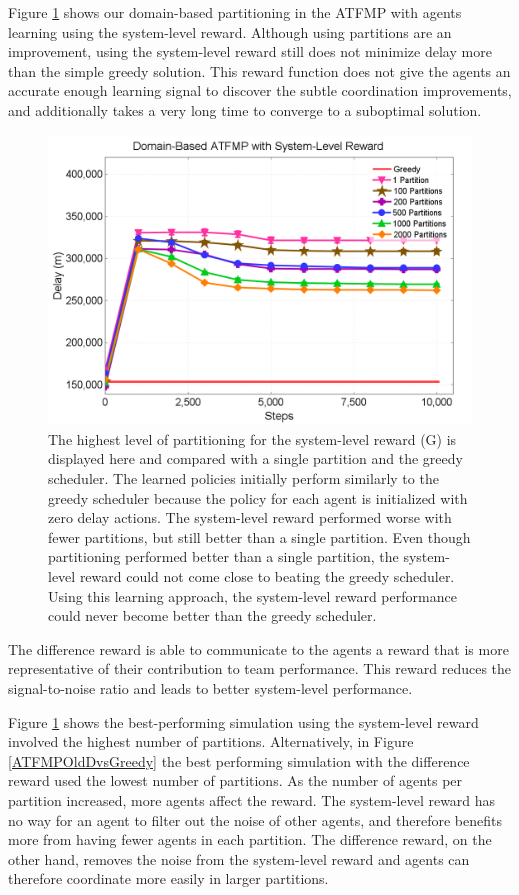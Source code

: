 \documentclass[smallcondensed]{svjour3}
\begin{document}
Figure \ref{ClusterRewardsGreedyG} shows our domain-based partitioning in the ATFMP with agents learning using the system-level reward. Although using partitions are an improvement, using the system-level reward still does not minimize delay more than the simple greedy solution. This reward function does not give the agents an accurate enough learning signal to discover the subtle coordination improvements, and additionally takes a very long time to converge to a suboptimal solution. 

\begin{figure}[]
\centering
\includegraphics[width=.75\columnwidth]{ClusterRewardsGreedyG}
\caption{The highest level of partitioning for the system-level reward (G) is displayed here and compared with a single partition and the greedy scheduler. The learned policies initially perform similarly to the greedy scheduler because the policy for each agent is initialized with zero delay actions. The system-level reward performed worse with fewer partitions, but still better than a single partition. Even though partitioning performed better than a single partition, the system-level reward could not come close to beating the greedy scheduler. Using this learning approach, the system-level reward performance could never become better than the greedy scheduler.}
\label{ClusterRewardsGreedyG}
\end{figure}

The difference reward is able to communicate to the agents a reward that is more representative of their contribution to team performance. This reward reduces the signal-to-noise ratio and leads to better system-level performance. 

Figure \ref{ClusterRewardsGreedyG} shows the best-performing simulation using the system-level reward involved the highest number of partitions. Alternatively, in Figure \ref{ATFMPOldDvsGreedy} the best performing simulation with the difference reward used the lowest number of partitions. As the number of agents per partition increased, more agents affect the reward. The system-level reward has no way for an agent to filter out the noise of other agents, and therefore benefits more from having fewer agents in each partition. The difference reward, on the other hand, removes the noise from the system-level reward and agents can therefore coordinate more easily in larger partitions.
\end{document}
